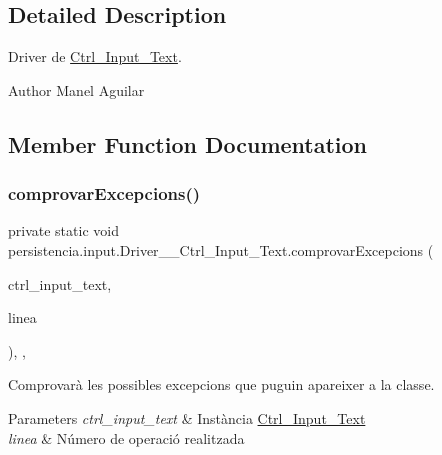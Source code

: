 \subsection{Detailed Description}
Driver de \hyperlink{classpersistencia_1_1input_1_1Ctrl__Input__Text}{Ctrl\+\_\+\+Input\+\_\+\+Text}. 

\begin{DoxyAuthor}{Author}
Manel Aguilar 
\end{DoxyAuthor}


\subsection{Member Function Documentation}
\mbox{\label{classpersistencia_1_1input_1_1Driver____Ctrl__Input__Text_a3e4149adb11b97b330ce77f1c2b5ae9c}} 
\subsubsection{\texorpdfstring{comprovar\+Excepcions()}{comprovarExcepcions()}}
{\footnotesize\ttfamily private static void persistencia.\+input.\+Driver\+\_\+\+\_\+\+Ctrl\+\_\+\+Input\+\_\+\+Text.\+comprovar\+Excepcions (\begin{DoxyParamCaption}\item[{\hyperlink{classpersistencia_1_1input_1_1Ctrl__Input__Text}{Ctrl\+\_\+\+Input\+\_\+\+Text}}]{ctrl\+\_\+input\+\_\+text,  }\item[{String}]{linea }\end{DoxyParamCaption})\hspace{0.3cm}{\ttfamily [inline]}, {\ttfamily [static]}, {\ttfamily [private]}}



Comprovarà les possibles excepcions que puguin apareixer a la classe. 


\begin{DoxyParams}{Parameters}
{\em ctrl\+\_\+input\+\_\+text} & Instància \hyperlink{classpersistencia_1_1input_1_1Ctrl__Input__Text}{Ctrl\+\_\+\+Input\+\_\+\+Text} \\
\hline
{\em linea} & Número de operació realitzada \\
\hline
\end{DoxyParams}
\mbox{\label{classpersistencia_1_1input_1_1Driver____Ctrl__Input__Text_a38cebd4cadb9198cb6a2c87147646ec0}} 

